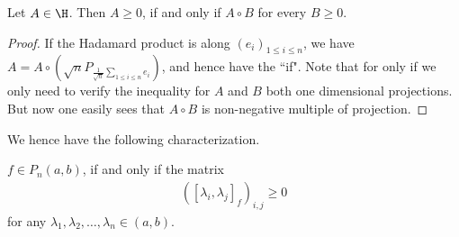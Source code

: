 \begin{lem}
	Let $A \in \H$. Then $A \geq 0$, if and only if $A \circ B$ for every $B \geq 0$.
\end{lem}

\begin{proof}
	If the Hadamard product is along $(e_{i})_{1 \leq i \leq n}$, we have $A = A \circ \left(\sqrt{n} P_{\frac{1}{\sqrt{n}}\sum_{1 \leq i \leq n} e_{i}} \right)$, and hence have the ``if". Note that for only if we only need to verify the inequality for $A$ and $B$ both one dimensional projections. But now one easily sees that $A \circ B$ is non-negative multiple of projection.
\end{proof}

We hence have the following characterization.

\begin{lause}
	$f \in P_{n}(a, b)$, if and only if the matrix
	\begin{align*}
		\left([\lambda_{i}, \lambda_{j}]_{f}\right)_{i, j} \geq 0
	\end{align*}
	for any $\lambda_{1}, \lambda_{2}, \ldots, \lambda_{n} \in (a, b)$.
\end{lause}




